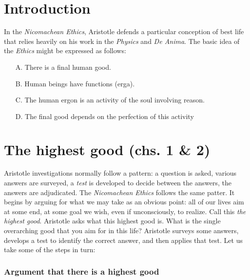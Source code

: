 \documentclass[oneside]{article}
\begin{document}
\thispagestyle{fancy}

\section*{Introduction}
In the \emph{Nicomachean Ethics}, Aristotle defends a particular conception of best life that relies heavily on his work in the \emph{Physics} and \emph{De Anima}.  The basic idea of the \emph{Ethics} might be expressed as follows: 

\begin{enumerate}
\item[A.] There is a final human good. 
\item[B.] Human beings have functions (erga).
\item[C.] The human ergon is an activity of the soul involving reason.
\item[D.] The final good depends on the perfection of this activity
\end{enumerate}

\section*{The highest good (chs. 1 \& 2)}

Aristotle investigations normally follow a pattern: a question is asked, various answers are surveyed, a \emph{test} is developed to decide between the answers, the answers are adjudicated. The \emph{Nicomachean Ethics} follows the same patter. It begins by arguing for what we may take as an obvious point: all of our lives aim at some end, at some goal we wish, even if unconsciously, to realize. Call this \emph{the highest good}. Aristotle asks what this highest good is. What is the single overarching good that you aim for in this life? Aristotle surveys some answers, develops a test to identify the correct answer, and then applies that test. Let us take some of the steps in turn: 

\subsubsection*{Argument that there is a highest good}
\end{document}
